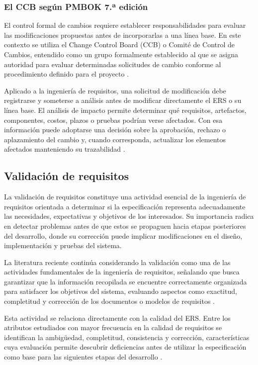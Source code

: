 \documentclass[journal,onecolumn]{IEEEtran}
\begin{document}
	\subsubsection{El CCB según PMBOK 7.ª edición}
	
	El control formal de cambios requiere establecer responsabilidades para evaluar las modificaciones propuestas antes de incorporarlas a una línea base. En este contexto se utiliza el Change Control Board (CCB) o Comité de Control de Cambios, entendido como un grupo formalmente establecido al que se asigna autoridad para evaluar determinadas solicitudes de cambio conforme al procedimiento definido para el proyecto \cite{PMBOK7-2021}.
	
	Aplicado a la ingeniería de requisitos, una solicitud de modificación debe registrarse y someterse a análisis antes de modificar directamente el ERS o su línea base. El análisis de impacto permite determinar qué requisitos, artefactos, componentes, costos, plazos o pruebas podrían verse afectados. Con esa información puede adoptarse una decisión sobre la aprobación, rechazo o aplazamiento del cambio y, cuando corresponda, actualizar los elementos afectados manteniendo su trazabilidad \cite{PMBOK7-2021}.
	
	\subsection{Validación de requisitos}
	
	La validación de requisitos constituye una actividad esencial de la ingeniería de requisitos orientada a determinar si la especificación representa adecuadamente las necesidades, expectativas y objetivos de los interesados. Su importancia radica en detectar problemas antes de que estos se propaguen hacia etapas posteriores del desarrollo, donde su corrección puede implicar modificaciones en el diseño, implementación y pruebas del sistema.
	
	La literatura reciente continúa considerando la validación como una de las actividades fundamentales de la ingeniería de requisitos, señalando que busca garantizar que la información recopilada se encuentre correctamente organizada para satisfacer los objetivos del sistema, evaluando aspectos como exactitud, completitud y corrección de los documentos o modelos de requisitos \cite{Umar2024}.
	
	Esta actividad se relaciona directamente con la calidad del ERS. Entre los atributos estudiados con mayor frecuencia en la calidad de requisitos se identifican la ambigüedad, completitud, consistencia y corrección, características cuya evaluación permite descubrir deficiencias antes de utilizar la especificación como base para las siguientes etapas del desarrollo \cite{Montgomery2022}.
	
\end{document}
